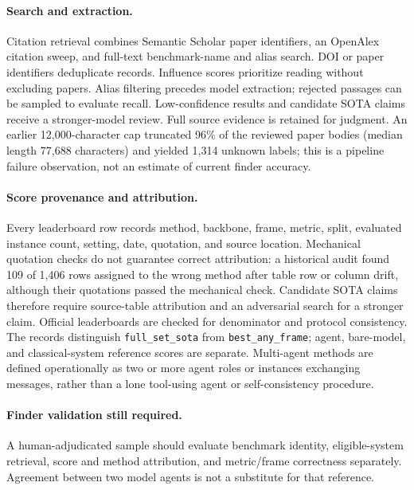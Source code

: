 \paragraph{Search and extraction.}
Citation retrieval combines Semantic Scholar paper identifiers, an OpenAlex citation sweep,
and full-text benchmark-name and alias search. DOI or paper identifiers deduplicate records.
Influence scores prioritize reading without excluding papers. Alias filtering precedes model
extraction; rejected passages can be sampled to evaluate recall. Low-confidence results and
candidate SOTA claims receive a stronger-model review. Full source evidence is retained for
judgment. An earlier 12{,}000-character cap truncated 96\% of the reviewed paper bodies
(median length 77{,}688 characters) and yielded 1{,}314 unknown labels; this is a pipeline
failure observation, not an estimate of current finder accuracy.

\paragraph{Score provenance and attribution.}
Every leaderboard row records method, backbone, frame, metric, split, evaluated instance count,
setting, date, quotation, and source location. Mechanical quotation checks do not guarantee
correct attribution: a historical audit found 109 of 1{,}406 rows assigned to the wrong method
after table row or column drift, although their quotations passed the mechanical check.
Candidate SOTA claims therefore require source-table attribution and an adversarial search for
a stronger claim. Official leaderboards are checked for denominator and protocol consistency.
The records distinguish \texttt{full\_set\_sota} from \texttt{best\_any\_frame}; agent,
bare-model, and classical-system reference scores are separate. Multi-agent methods are defined
operationally as two or more agent roles or instances exchanging messages, rather than a lone
tool-using agent or self-consistency procedure.

\paragraph{Finder validation still required.}
A human-adjudicated sample should evaluate benchmark identity, eligible-system retrieval,
score and method attribution, and metric/frame correctness separately. Agreement between two
model agents is not a substitute for that reference. 


